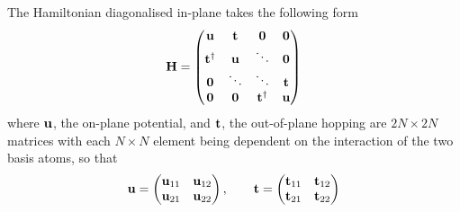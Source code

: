 \documentclass[a4paper, 12pt]{article}
\begin{document}
	The Hamiltonian diagonalised in-plane takes the following form
	\begin{equation}
	\bf	H = \begin{pmatrix} \bf u&\bf t& \bf 0&\bf 0\\\bf t^\dagger&\bf u &\ddots&\bf 0\\\bf 0&\ddots&\ddots&\bf t\\\bf 0&\bf 0&\bf t^\dagger&\bf u\end{pmatrix}
	\end{equation}
	where $\bf u$, the on-plane potential, and $\bf t$, the out-of-plane hopping are $2N\times2N$ matrices with each $N\times N$ element being dependent on the interaction of the two basis atoms, so that
	\begin{equation}
		\bf u = \begin{pmatrix} {\bf u}_{11}&{\bf u}_{12}\\{\bf u}_{21}&{\bf u}_{22}\end{pmatrix}, \qquad \bf t = \begin{pmatrix} {\bf t}_{11}&{\bf t}_{12}\\{\bf t}_{21}&{\bf t}_{22}\end{pmatrix}
	\end{equation}
\end{document}

